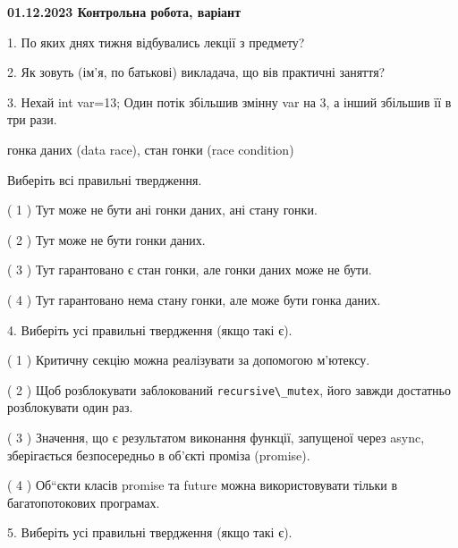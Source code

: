 \documentclass[12pt, ukrainian]{article}
\def\code#1{\Verb!#1!}
\begin{document}
\vspace{4mm}
\newpage
\begin {large}

\textbf{01.12.2023 Контрольна робота, варіант  }\par


{
1. По яких днях тижня відбувались лекції з предмету?



\vspace{5mm}
2. Як зовуть (ім'я, по батькові) викладача, що вів практичні заняття?



\vspace{5mm}
3. Нехай int var=13; Один потік збільшив змінну var на 3, а інший збільшив її в три рази.

гонка даних (data race), стан гонки (race condition)

Виберіть всі правильні твердження.\par
\vspace{2mm}
( 1 ) Тут може не бути ані гонки даних, ані стану гонки.%

( 2 ) Тут може не бути гонки даних.%

( 3 ) Тут гарантовано є стан гонки, але гонки даних може не бути.%

( 4 ) Тут гарантовано нема стану гонки, але може бути гонка даних.%


\vspace{5mm}
4. Виберіть усі правильні твердження (якщо такі є).\par
\vspace{2mm}

( 1 ) Критичну секцію можна реалізувати за допомогою м’ютексу.%

( 2 ) Щоб розблокувати заблокований \code{recursive\_mutex}, його завжди достатньо розблокувати один раз.%

( 3 ) Значення, що є результатом виконання функції, запущеної через async, зберігається безпосередньо в об’єкті проміза (promise).%

( 4 ) Об“єкти класів promise та future можна використовувати тільки в багатопотокових програмах.%


\vspace{5mm}
5. Виберіть усі правильні твердження (якщо такі є).\par
\vspace{2mm}

}
\end{large}
\end{document}
